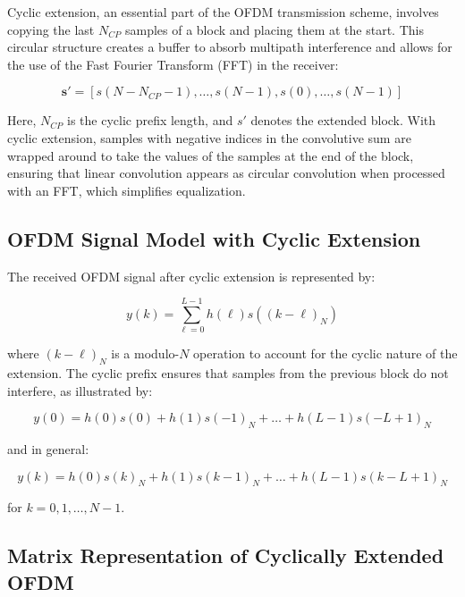 Cyclic extension, an essential part of the OFDM transmission scheme, involves copying the last \(N_{CP}\) samples of a block and placing them at the start. This circular structure creates a buffer to absorb multipath interference and allows for the use of the Fast Fourier Transform (FFT) in the receiver:

\begin{equation}
    \mathbf{s}' = [s(N - N_{CP} - 1), \ldots, s(N - 1), s(0), \ldots, s(N - 1)]
\end{equation}

Here, \(N_{CP}\) is the cyclic prefix length, and \(s'\) denotes the extended block. With cyclic extension, samples with negative indices in the convolutive sum are wrapped around to take the values of the samples at the end of the block, ensuring that linear convolution appears as circular convolution when processed with an FFT, which simplifies equalization.






\subsection*{OFDM Signal Model with Cyclic Extension}

The received OFDM signal after cyclic extension is represented by:

\begin{equation}
    y(k) = \sum_{\ell=0}^{L-1} h(\ell) s((k - \ell)_N)
\end{equation}

where \((k - \ell)_N\) is a modulo-\(N\) operation to account for the cyclic nature of the extension. The cyclic prefix ensures that samples from the previous block do not interfere, as illustrated by:

\begin{equation}
    y(0) = h(0)s(0) + h(1)s(-1)_N + \ldots + h(L - 1)s(-L + 1)_N
\end{equation}

and in general:

\begin{equation}
    y(k) = h(0)s(k)_N + h(1)s(k - 1)_N + \ldots + h(L - 1)s(k - L + 1)_N
\end{equation}

for \(k = 0, 1, \ldots, N-1\).

\subsection*{Matrix Representation of Cyclically Extended OFDM}

